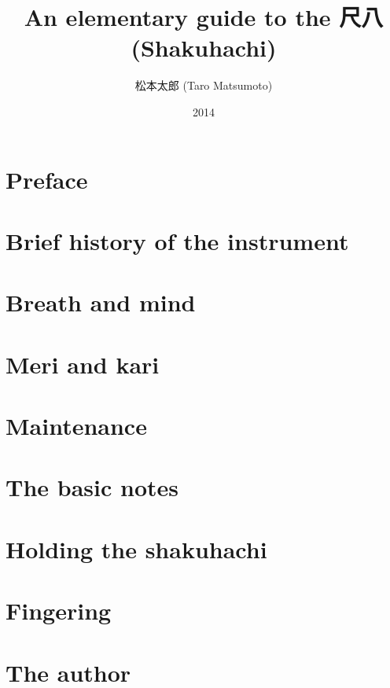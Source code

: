 \documentclass[b5paper]{memoir}
\begin{document}
\frontmatter

\title{\Huge An elementary guide to the 尺八 (Shakuhachi)}
\author{\huge 松本太郎 (Taro Matsumoto)}
\date{\Large 2014}
\maketitle

\cleardoublepage

\tableofcontents
\listoffigures

\cleardoublepage

\section{Preface}


\cleardoublepage

\mainmatter

\section{Brief history of the instrument}


\section{Breath and mind}


\section{Meri and kari}


\enlargethispage{-2.0cm}

\section{Maintenance}


\section{The basic notes}


\section{Holding the shakuhachi}


\appendix
\appendixpage

\section{Fingering}


\clearpage

\section{The author}


\backmatter
\end{document}
